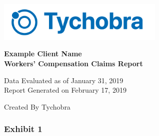 \documentclass[landscape]{article}
\title{}
\author{}
\date{}
\begin{document}
\begin{titlepage}
  
  \setlength{\headsep}{0.4in}
  
  \includegraphics[width=8cm]{./images/tychobra_logo_blue_co_name}\\
  
  \vspace{2.5cm}
  
  \Huge
   
    \textbf{Example Client Name}\\
    \textbf{Workers' Compensation Claims Report}
  \Huge
  
  \huge
    Data Evaluated as of January 31, 2019\\
    Report Generated on February 17, 2019
  \huge
  \vspace{1mm}
  
  \Large
   \noindent Created By Tychobra
  \Large
  \\
  
  
  \vspace{5cm}
  
 
\end{titlepage}



\captionsetup[table]{labelformat=empty}

\renewcommand{\arraystretch}{2}

\newpage

\hypertarget{exhibit-1}{%
\subsubsection{Exhibit 1}\label{exhibit-1}}
\end{document}
